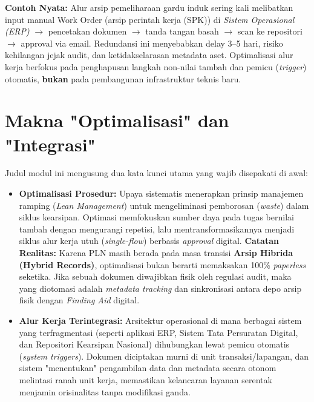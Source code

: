 \documentclass[12pt,a4paper]{report}
\begin{document}
\begin{plnbox}
\textbf{Contoh Nyata:} Alur arsip pemeliharaan gardu induk sering kali melibatkan input manual Work Order (arsip perintah kerja (SPK)) di \textit{Sistem Operasional (ERP)} $\rightarrow$ pencetakan dokumen $\rightarrow$ tanda tangan basah $\rightarrow$ scan ke repositori $\rightarrow$ approval via email. Redundansi ini menyebabkan delay 3--5 hari, risiko kehilangan jejak audit, dan ketidakselarasan metadata aset. Optimalisasi alur kerja berfokus pada penghapusan langkah non-nilai tambah dan pemicu (\textit{trigger}) otomatis, \textbf{bukan} pada pembangunan infrastruktur teknis baru.
\end{plnbox}

\section{Makna "Optimalisasi" dan "Integrasi"}
Judul modul ini mengusung dua kata kunci utama yang wajib disepakati di awal:
\begin{itemize}[leftmargin=*]
    \item \textbf{Optimalisasi Prosedur:} Upaya sistematis menerapkan prinsip manajemen ramping (\textit{Lean Management}) untuk mengeliminasi pemborosan (\textit{waste}) dalam siklus kearsipan. Optimasi memfokuskan sumber daya pada tugas bernilai tambah dengan mengurangi repetisi, lalu mentransformasikannya menjadi siklus alur kerja utuh (\textit{single-flow}) berbasis \textit{approval} digital. \textbf{Catatan Realitas:} Karena PLN masih berada pada masa transisi \textbf{Arsip Hibrida (Hybrid Records)}, optimalisasi bukan berarti memaksakan 100\% \textit{paperless} seketika. Jika sebuah dokumen diwajibkan fisik oleh regulasi audit, maka yang diotomasi adalah \textit{metadata tracking} dan sinkronisasi antara depo arsip fisik dengan \textit{Finding Aid} digital.
    \item \textbf{Alur Kerja Terintegrasi:} Arsitektur operasional di mana berbagai sistem yang terfragmentasi (seperti aplikasi ERP, Sistem Tata Persuratan Digital, dan Repositori Kearsipan Nasional) dihubungkan lewat pemicu otomatis (\textit{system triggers}). Dokumen diciptakan murni di unit transaksi/lapangan, dan sistem "menentukan" pengambilan data dan metadata secara otonom melintasi ranah unit kerja, memastikan kelancaran layanan serentak menjamin orisinalitas tanpa modifikasi ganda.
\end{itemize}
\end{document}
